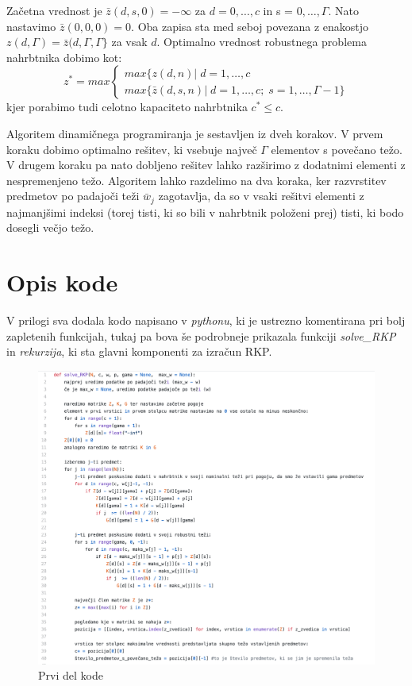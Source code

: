 \documentclass[a4paper,12pt]{article}
\theoremstyle{definition}
\begin{document}
\noindent Začetna vrednost je $\bar{z}(d, s, 0) = -\infty$ za $d = 0, \dots,c$ in s = $0, \dots, \Gamma$. 
Nato nastavimo $\bar{z}(0, 0, 0) = 0$. Oba zapisa sta med seboj povezana z enakostjo $z(d, \Gamma) = 
\bar{z}(d, \Gamma, \Gamma\}$ za vsak $d$. Optimalno vrednost robustnega problema nahrbtnika dobimo kot:
\begin{equation}
\tag*{}
z^{*} = max \begin{cases}
max\{z(d, n) |\; d = 1, \dots, c \\
max\{\bar{z}(d, s, n) |\; d = 1, \dots, c; \;s = 1, \dots, \Gamma -1\}
\end{cases}
\end{equation}
\medskip
kjer porabimo tudi celotno kapaciteto nahrbtnika $c^{*} \leq c$.
\par
Algoritem dinamičnega programiranja je sestavljen iz dveh korakov. V prvem koraku dobimo optimalno 
rešitev, ki vsebuje največ $\Gamma$ elementov s povečano težo. V drugem koraku pa nato dobljeno 
rešitev lahko razširimo z dodatnimi elementi z nespremenjeno težo. Algoritem lahko razdelimo na dva 
koraka, ker razvrstitev predmetov po padajoči teži $\bar{w}_j$ zagotavlja, da so v vsaki rešitvi 
elementi z najmanjšimi indeksi (torej tisti, ki so bili v nahrbtnik položeni prej) tisti, ki bodo 
dosegli večjo težo.

\section{Opis kode}
\medskip
V prilogi sva dodala kodo napisano v \textit{pythonu}, ki je ustrezno komentirana pri bolj zapletenih 
funkcijah, tukaj pa bova še podrobneje prikazala funkciji \textit{solve\_RKP} in \textit{rekurzija}, ki sta glavni komponenti
za izračun RKP. 
\medskip

\begin{figure}[hb!]
    \includegraphics[width=13cm]{opis_kode1.png}
    \caption{Prvi del kode}
    \label{fig:koda1}    
\end{figure}
\end{document}
